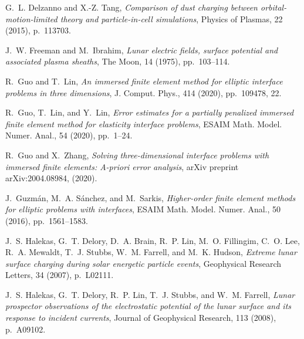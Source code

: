 \documentclass{siamart171218}
\begin{document}
\begin{thebibliography}{99}
{\sc G.~L. Delzanno and X.-Z. Tang}, {\em Comparison of dust charging between
  orbital-motion-limited theory and particle-in-cell simulations}, Physics of
  Plasmas, 22 (2015), p.~113703.

{\sc J.~W. Freeman and M.~Ibrahim}, {\em Lunar electric fields, surface
  potential and associated plasma sheaths}, The Moon, 14 (1975), pp.~103--114.

{\sc R.~Guo and T.~Lin}, {\em An immersed finite element method for elliptic
  interface problems in three dimensions}, J. Comput. Phys., 414 (2020),
  pp.~109478, 22.

{\sc R.~Guo, T.~Lin, and Y.~Lin}, {\em Error estimates for a partially
  penalized immersed finite element method for elasticity interface problems},
  ESAIM Math. Model. Numer. Anal., 54 (2020), pp.~1--24.

{\sc R.~Guo and X.~Zhang}, {\em Solving three-dimensional interface problems
  with immersed finite elements: A-priori error analysis}, arXiv preprint
  arXiv:2004.08984,  (2020).

{\sc J.~Guzm\'an, M.~A. S\'anchez, and M.~Sarkis}, {\em Higher-order finite
  element methods for elliptic problems with interfaces}, ESAIM Math. Model.
  Numer. Anal., 50 (2016), pp.~1561--1583.

{\sc J.~S. Halekas, G.~T. Delory, D.~A. Brain, R.~P. Lin, M.~O. Fillingim,
  C.~O. Lee, R.~A. Mewaldt, T.~J. Stubbs, W.~M. Farrell, and M.~K. Hudson},
  {\em Extreme lunar surface charging during solar energetic particle events},
  Geophysical Research Letters, 34 (2007), p.~L02111.

{\sc J.~S. Halekas, G.~T. Delory, R.~P. Lin, T.~J. Stubbs, and W.~M. Farrell},
  {\em Lunar prospector observations of the electrostatic potential of the
  lunar surface and its response to incident currents}, Journal of Geophysical
  Research, 113 (2008), p.~A09102.


\end{thebibliography}
\end{document}
